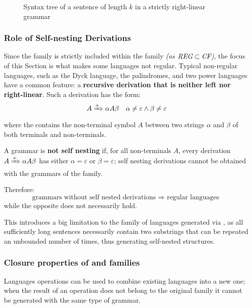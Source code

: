 \documentclass[english]{article}
\begin{document}
\begin{figure}[htbp]
  \centering
  \bigskip
  \caption{Syntax tree of a sentence of length \(k\) in a strictly right-linear grammar}
  \label{fig:pumping-strings-syntax-tree}
  \bigskip
\end{figure}

\subsubsection{Role of Self-nesting Derivations}

Since the \REG family is strictly included within the \CF family \textit{(as \(\textit{REG} \subset \textit{CF}\))}, the focus of this Section is what makes some languages not regular.
Typical non-regular languages, such as the Dyck language, the palindromes, and two power languages have a common feature:
a \textbf{recursive derivation that is neither left nor right-linear}.
Such a derivation has the form:
\[ A \xRightarrow{+} \alpha A \beta \quad \alpha \neq \varepsilon \land \beta \neq \varepsilon \]
where the \RP contains the non-terminal symbol \(A\) between two strings \(\alpha\) and \(\beta\) of both terminals and non-terminals.

\bigskip
A grammar is \textbf{not self nesting} if, for all non-terminals \(A\), every derivation \(A \xRightarrow{+} \alpha A \beta\) has either \(\alpha = \varepsilon\) or \(\beta = \varepsilon\);
self nesting derivations cannot be obtained with the grammars of the \REG family.

Therefore:
\[ \text{grammars without self nested derivations } \Rightarrow \text{ regular languages } \]
while the opposite does not necessarily hold.

\bigskip
This introduces a big limitation to the family of languages generated via \re, as all sufficiently long sentences necessarily contain two substrings that can be repeated an unbounded number of times, thus generating self-nested structures.

\subsubsection{Closure properties of \REG and \CF families}
\label{sec:closure-properties-reg-and-cf}

Languages operations can be used to combine existing languages into a new one;
when the result of an operation does not belong to the original family it cannot be generated with the same type of grammar.
\end{document}
